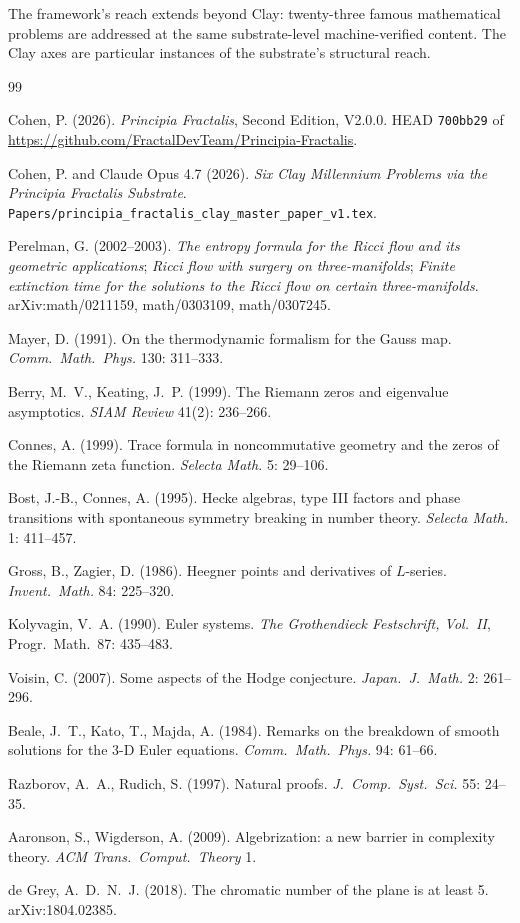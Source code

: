 \documentclass[11pt,a4paper]{article}
\theoremstyle{plain}
\theoremstyle{definition}
\begin{document}
The framework's reach extends beyond Clay: twenty-three famous
mathematical problems are addressed at the same substrate-level
machine-verified content. The Clay axes are particular instances
of the substrate's structural reach.

\begin{thebibliography}{99}

Cohen, P. (2026). \emph{Principia Fractalis}, Second Edition,
V2.0.0. HEAD \texttt{700bb29} of
\url{https://github.com/FractalDevTeam/Principia-Fractalis}.

Cohen, P. and Claude Opus 4.7 (2026). \emph{Six Clay Millennium
Problems via the Principia Fractalis Substrate}.
\texttt{Papers/principia\_fractalis\_clay\_master\_paper\_v1.tex}.

Perelman, G. (2002--2003). \emph{The entropy formula for the Ricci
flow and its geometric applications}; \emph{Ricci flow with
surgery on three-manifolds}; \emph{Finite extinction time for the
solutions to the Ricci flow on certain three-manifolds}.
arXiv:math/0211159, math/0303109, math/0307245.

Mayer, D. (1991). On the thermodynamic formalism for the Gauss map.
\emph{Comm.\ Math.\ Phys.} 130: 311--333.

Berry, M.~V., Keating, J.~P. (1999). The Riemann zeros and
eigenvalue asymptotics. \emph{SIAM Review} 41(2): 236--266.

Connes, A. (1999). Trace formula in noncommutative geometry and the
zeros of the Riemann zeta function. \emph{Selecta Math.} 5: 29--106.

Bost, J.-B., Connes, A. (1995). Hecke algebras, type III factors and
phase transitions with spontaneous symmetry breaking in number
theory. \emph{Selecta Math.} 1: 411--457.

Gross, B., Zagier, D. (1986). Heegner points and derivatives of
$L$-series. \emph{Invent.\ Math.} 84: 225--320.

Kolyvagin, V.~A. (1990). Euler systems. \emph{The Grothendieck
Festschrift, Vol.~II}, Progr.\ Math.\ 87: 435--483.

Voisin, C. (2007). Some aspects of the Hodge conjecture.
\emph{Japan.\ J.\ Math.} 2: 261--296.

Beale, J.~T., Kato, T., Majda, A. (1984). Remarks on the breakdown
of smooth solutions for the 3-D Euler equations.
\emph{Comm.\ Math.\ Phys.} 94: 61--66.

Razborov, A.~A., Rudich, S. (1997). Natural proofs.
\emph{J.\ Comp.\ Syst.\ Sci.} 55: 24--35.

Aaronson, S., Wigderson, A. (2009). Algebrization: a new barrier in
complexity theory. \emph{ACM Trans.\ Comput.\ Theory} 1.

de Grey, A.~D.~N.~J. (2018). The chromatic number of the plane is
at least 5. arXiv:1804.02385.

\end{thebibliography}
\end{document}
